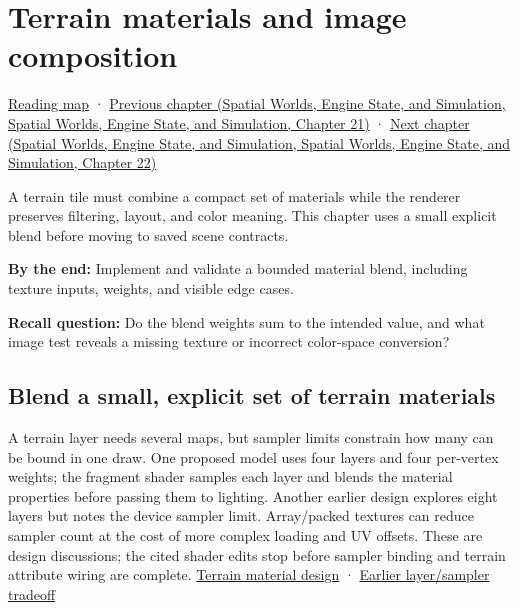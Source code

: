 \hypertarget{06-engine-ii-ch032}{}
\chapter{Terrain materials and image composition}\label{stagechapter:06-engine-ii-ch032}\label{06-engine-ii-ch032-terrain-materials-and-image-composition}

\hyperref[volume-reading-map]{Reading map} · \href{../05-Spatial-Worlds-Engine-State-and-Simulation/main.pdf\#nameddest=06-engine-ii-ch031-spatial-index-serialization-and-query-evidence}{Previous chapter (Spatial Worlds, Engine State, and Simulation, Spatial Worlds, Engine State, and Simulation, Chapter 21)} · \href{../05-Spatial-Worlds-Engine-State-and-Simulation/main.pdf\#nameddest=06-engine-ii-ch033-versioned-scenes-and-transactional-loading}{Next chapter (Spatial Worlds, Engine State, and Simulation, Spatial Worlds, Engine State, and Simulation, Chapter 22)}

A terrain tile must combine a compact set of materials while the renderer preserves filtering, layout, and color meaning. This chapter uses a small explicit blend before moving to saved scene contracts.

\textbf{By the end:} Implement and validate a bounded material blend, including texture inputs, weights, and visible edge cases.

\textbf{Recall question:} Do the blend weights sum to the intended value, and what image test reveals a missing texture or incorrect color-space conversion?

\section{Blend a small, explicit set of terrain materials}\label{06-engine-ii-ch032-blend-a-small-explicit-set-of-terrain-materials}

A terrain layer needs several maps, but sampler limits constrain how many can be bound in one draw. One proposed model uses four layers and four per-vertex weights; the fragment shader samples each layer and blends the material properties before passing them to lighting. Another earlier design explores eight layers but notes the device sampler limit. Array/packed textures can reduce sampler count at the cost of more complex loading and UV offsets. These are design discussions; the cited shader edits stop before sampler binding and terrain attribute wiring are complete. \href{https://www.youtube.com/watch?v=vLzvpFaX50A}{Terrain material design} · \href{https://www.youtube.com/watch?v=unypFSvg7gI}{Earlier layer/sampler tradeoff}

